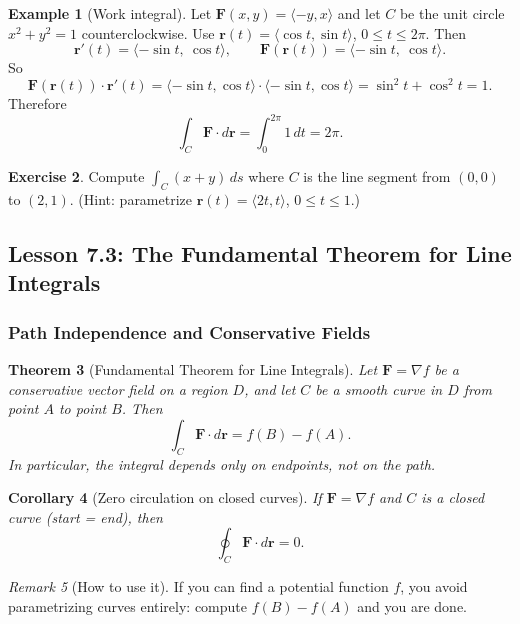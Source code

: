 \documentclass[12pt]{article}
\numberwithin{equation}{section}
\newcommand{\vect}[1]{\boldsymbol{#1}}   %
\theoremstyle{plain}
\newtheorem{theorem}{Theorem}[section]
\newtheorem{corollary}[theorem]{Corollary}
\theoremstyle{definition}
\newtheorem{example}[theorem]{Example}
\newtheorem{exercise}[theorem]{Exercise}
\theoremstyle{remark}
\newtheorem{remark}[theorem]{Remark}
\begin{document}
\begin{example}[Work integral]\label{ex:work}
Let $\vect F(x,y)=\langle -y,x\rangle$ and let $C$ be the unit circle $x^2+y^2=1$ counterclockwise.  
Use $\vect r(t)=\langle \cos t,\sin t\rangle$, $0\le t\le 2\pi$.
Then
\[
\vect r'(t)=\langle -\sin t,\ \cos t\rangle,\qquad
\vect F(\vect r(t))=\langle -\sin t,\ \cos t\rangle.
\]
So
\[
\vect F(\vect r(t))\cdot \vect r'(t)
=\langle -\sin t,\cos t\rangle\cdot \langle -\sin t,\cos t\rangle
=\sin^2 t+\cos^2 t=1.
\]
Therefore
\[
\int_C \vect F\cdot d\vect r=\int_{0}^{2\pi}1\,dt=2\pi.
\]
\end{example}

\begin{exercise}
Compute $\displaystyle \int_C (x+y)\,ds$ where $C$ is the line segment from $(0,0)$ to $(2,1)$.
(Hint: parametrize $\vect r(t)=\langle 2t,t\rangle$, $0\le t\le 1$.)
\end{exercise}

\subsection{Lesson 7.3: The Fundamental Theorem for Line Integrals}

\subsubsection{Path Independence and Conservative Fields}

\begin{theorem}[Fundamental Theorem for Line Integrals]\label{thm:ftli}
Let $\vect F=\nabla f$ be a conservative vector field on a region $D$, and let $C$ be a smooth curve in $D$ from point $A$ to point $B$. Then
\begin{equation}\label{eq:ftli}
\int_C \vect F\cdot d\vect r = f(B)-f(A).
\end{equation}
In particular, the integral depends only on endpoints, not on the path.
\end{theorem}

\begin{corollary}[Zero circulation on closed curves]\label{cor:closed-zero}
If $\vect F=\nabla f$ and $C$ is a closed curve (start = end), then
\[
\oint_C \vect F\cdot d\vect r = 0.
\]
\end{corollary}

\begin{remark}[How to use it]
If you can find a potential function $f$, you avoid parametrizing curves entirely: compute $f(B)-f(A)$ and you are done.
\end{remark}
\end{document}
